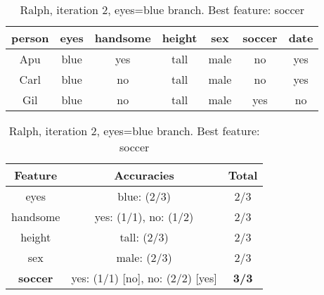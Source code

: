 \begin{table}[h!]
  \centering
  \begin{tabular}{cccccc|c}
    \toprule
    person      & eyes  & handsome & height & sex    & soccer & date\\
    \midrule
    Apu         & blue  & yes      & tall   & male   & no     & yes \\
    Carl        & blue  & no       & tall   & male   & no     & yes \\
    Gil         & blue  & no       & tall   & male   & yes    & no  \\
    \bottomrule
  \end{tabular}

  \vspace{.5cm}

  \begin{tabular}{ccc}
    \toprule
    Feature         & Accuracies                              & Total\\
    \midrule
    eyes            & blue: (2/3)                             & 2/3\\
    handsome        & yes: (1/1), no: (1/2)                   & 2/3\\
    height          & tall: (2/3)                             & 2/3\\
    sex             & male: (2/3)                             & 2/3\\
    \textbf{soccer} & yes: (1/1) [no], no: (2/2) [yes]        & \textbf{3/3}\\
    \bottomrule
  \end{tabular}
  \caption*{Ralph, iteration 2, eyes=blue branch. Best feature: soccer}
\end{table}

